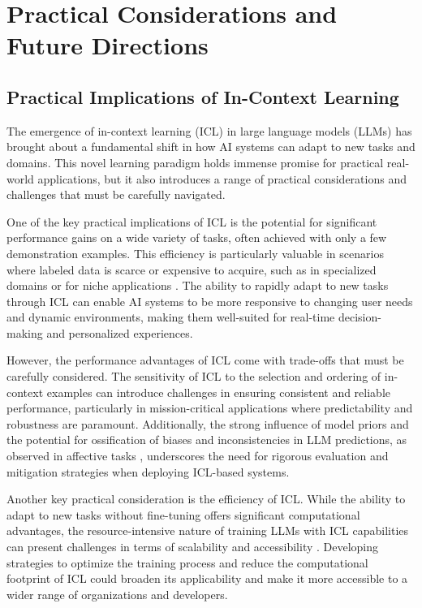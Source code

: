 \documentclass[11pt]{article}
\begin{document}
\section{Practical Considerations and Future Directions}

\subsection{Practical Implications of In-Context Learning}

The emergence of in-context learning (ICL) in large language models (LLMs) has brought about a fundamental shift in how AI systems can adapt to new tasks and domains. This novel learning paradigm holds immense promise for practical real-world applications, but it also introduces a range of practical considerations and challenges that must be carefully navigated.

One of the key practical implications of ICL is the potential for significant performance gains on a wide variety of tasks, often achieved with only a few demonstration examples. This efficiency is particularly valuable in scenarios where labeled data is scarce or expensive to acquire, such as in specialized domains or for niche applications \cite{ref8}. The ability to rapidly adapt to new tasks through ICL can enable AI systems to be more responsive to changing user needs and dynamic environments, making them well-suited for real-time decision-making and personalized experiences.

However, the performance advantages of ICL come with trade-offs that must be carefully considered. The sensitivity of ICL to the selection and ordering of in-context examples \cite{ref63,ref71,ref94} can introduce challenges in ensuring consistent and reliable performance, particularly in mission-critical applications where predictability and robustness are paramount. Additionally, the strong influence of model priors and the potential for ossification of biases and inconsistencies in LLM predictions, as observed in affective tasks \cite{ref95}, underscores the need for rigorous evaluation and mitigation strategies when deploying ICL-based systems.

Another key practical consideration is the efficiency of ICL. While the ability to adapt to new tasks without fine-tuning offers significant computational advantages, the resource-intensive nature of training LLMs with ICL capabilities can present challenges in terms of scalability and accessibility \cite{ref96}. Developing strategies to optimize the training process and reduce the computational footprint of ICL could broaden its applicability and make it more accessible to a wider range of organizations and developers.
\end{document}
